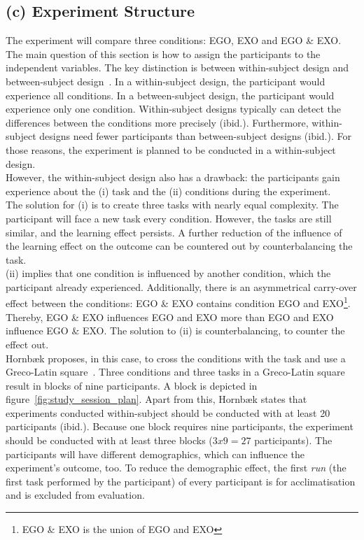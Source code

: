 \subsection{(c) Experiment Structure}
\label{sec:studyStructure}
The experiment will compare three conditions: EGO, EXO and EGO \& EXO. The main question of this section is how to assign the participants to the independent variables. The key distinction is between within-subject design and between-subject design~\cite{hornbaek}. In a within-subject design, the participant would experience all conditions. In a between-subject design, the participant would experience only one condition. Within-subject designs typically can detect the differences between the conditions more precisely (ibid.). Furthermore, within-subject designs need fewer participants than between-subject designs (ibid.). For those reasons, the experiment is planned to be conducted in a within-subject design.\\
However, the within-subject design also has a drawback: the participants gain experience about the (i) task and the (ii) conditions during the experiment.\\

The solution for (i) is to create three tasks with nearly equal complexity. The participant will face a new task every condition. However, the tasks are still similar, and the learning effect persists. A further reduction of the influence of the learning effect on the outcome can be countered out by counterbalancing the task.\\

(ii) implies that one condition is influenced by another condition, which the participant already experienced. Additionally, there is an asymmetrical carry-over effect between the conditions: EGO \& EXO contains condition EGO and EXO\footnote{EGO \& EXO is the union of EGO and EXO}. Thereby, EGO \& EXO influences EGO and EXO more than EGO and EXO influence EGO \& EXO. The solution to (ii) is counterbalancing, to counter the effect out.\\

Hornb\ae{}k proposes, in this case, to cross the conditions with the task and use a Greco-Latin square~\cite{hornbaek}. Three conditions and three tasks in a Greco-Latin square result in blocks of nine participants. A block is depicted in figure~\ref{fig:study_session_plan}. Apart from this, Hornb\ae{}k states that experiments conducted within-subject should be conducted with at least 20 participants (ibid.). Because one block requires nine participants, the experiment should be conducted with at least three blocks ($3x9=27$ participants). 
The participants will have different demographics, which can influence the experiment's outcome, too. To reduce the demographic effect, the first \textit{run} (the first task performed by the participant) of every participant is for acclimatisation and is excluded from evaluation.

